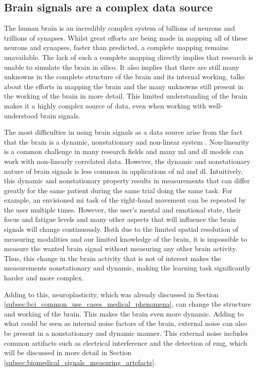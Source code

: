 
\subsection{Brain signals are a complex data source}
\label{subsec:bci_opportunities_obstacles_complex}


The human brain is an incredibly complex system of billions of neurons and trillions of synapses.
Whilst great efforts are being made in mapping all of these neurons and synapses, faster than predicted, a complete mapping remains unavailable.
The lack of such a complete mapping directly implies that research is unable to simulate the brain in silico.
It also implies that there are still many unknowns in the complete structure of the brain and its internal working.
 talks about the efforts in mapping the brain and the many unknowns still present in the working of the brain in more detail.
This limited understanding of the brain makes it a highly complex source of data, even when working with well-understood brain signals.

The most difficulties in using brain signals as a data source arise from the fact that the brain is a dynamic, nonstationary and non-linear system \citep{bci_applications}.
Non-linearity is a common challenge in many research fields and many \gls{ml} and \gls{dl} models can work with non-linearly correlated data.
However, the dynamic and nonstationary nature of brain signals is less common in applications of \gls{ml} and \gls{dl}.
Intuitively, this dynamic and nonstationary property results in measurements that can differ greatly for the same patient during the same trial doing the same task.
For example, an envisioned \gls{mi} task of the right-hand movement can be repeated by the user multiple times.
However, the user's mental and emotional state, their focus and fatigue levels and many other aspects that will influence the brain signals will change continuously.
Both due to the limited spatial resolution of measuring modalities and our limited knowledge of the brain, it is impossible to measure the wanted brain signal without measuring any other brain activity.
Thus, this change in the brain activity that is not of interest makes the measurements nonstationary and dynamic, making the learning task significantly harder and more complex.

Adding to this, neuroplasticity, which was already discussed in Section \ref{subsec:bci_common_use_cases_medical_phenomena}, can change the structure and working of the brain.
This makes the brain even more dynamic.
Adding to what could be seen as internal noise factors of the brain, external noise can also be present in a nonstationary and dynamic manner.
This external noise includes common artifacts such as electrical interference and the detection of \gls{emg}, which will be discussed in more detail in Section \ref{subsec:biomedical_signals_measuring_artefacts}.

